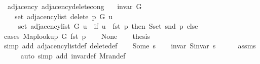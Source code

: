 \begin{isabellebody}
%
\endisadelimproof
\isanewline
{}\isamarkupfalse%
\ {\isacharparenleft}{\kern0pt}\ adjacency{\isacharparenright}{\kern0pt}\ adjacency{\isacharunderscore}{\kern0pt}delete{\isacharunderscore}{\kern0pt}{}{\isacharunderscore}{\kern0pt}cong{\isacharcolon}{\kern0pt}\isanewline
\ \ \ {\isachardoublequoteopen}invar\ G{\isachardoublequoteclose}\isanewline
\ \ \isanewline
\ \ \ \ {\isachardoublequoteopen}set\ {\isacharparenleft}{\kern0pt}adjacency{\isacharunderscore}{\kern0pt}list\ {\isacharparenleft}{\kern0pt}delete{\isacharunderscore}{\kern0pt}{}\ p\ G{\isacharparenright}{\kern0pt}\ u{\isacharparenright}{\kern0pt}\ {\isacharequal}{\kern0pt}\isanewline
\ \ \ \ \ set\ {\isacharparenleft}{\kern0pt}adjacency{\isacharunderscore}{\kern0pt}list\ G\ u{\isacharparenright}{\kern0pt}\ {\isacharminus}{\kern0pt}\ {\isacharparenleft}{\kern0pt}if\ u\ {\isacharequal}{\kern0pt}\ fst\ p\ then\ S{\isachardot}{\kern0pt}set\ {\isacharparenleft}{\kern0pt}snd\ p{\isacharparenright}{\kern0pt}\ else\ {\isacharbraceleft}{\kern0pt}{\isacharbraceright}{\kern0pt}{\isacharparenright}{\kern0pt}{\isachardoublequoteclose}\isanewline
%
\isadelimproof
%
\endisadelimproof
%
\isatagproof
{}\isamarkupfalse%
\ {\isacharparenleft}{\kern0pt}cases\ {\isachardoublequoteopen}Map{\isacharunderscore}{\kern0pt}lookup\ G\ {\isacharparenleft}{\kern0pt}fst\ p{\isacharparenright}{\kern0pt}{\isachardoublequoteclose}{\isacharparenright}{\kern0pt}\isanewline
\ \ \isamarkupfalse%
\ None\isanewline
\ \ \isamarkupfalse%
\ {\isacharquery}{\kern0pt}thesis\isanewline
\ \ \ \ \isamarkupfalse%
\ {\isacharparenleft}{\kern0pt}simp\ add{\isacharcolon}{\kern0pt}\ adjacency{\isacharunderscore}{\kern0pt}list{\isacharunderscore}{\kern0pt}def\ delete{\isacharunderscore}{\kern0pt}{}{\isacharunderscore}{\kern0pt}def{\isacharparenright}{\kern0pt}\isanewline
{}\isamarkupfalse%
\isanewline
\ \ \isamarkupfalse%
\ {\isacharparenleft}{\kern0pt}Some\ s{\isacharprime}{\kern0pt}{\isacharparenright}{\kern0pt}\isanewline
\ \ \isamarkupfalse%
\ invar{\isacharcolon}{\kern0pt}\ {\isachardoublequoteopen}S{\isachardot}{\kern0pt}invar\ s{\isacharprime}{\kern0pt}{\isachardoublequoteclose}\isanewline
\ \ \ \ \isamarkupfalse%
\ assms\isanewline
\ \ \ \ \isamarkupfalse%
\ {\isacharparenleft}{\kern0pt}auto\ simp\ add{\isacharcolon}{\kern0pt}\ invar{\isacharunderscore}{\kern0pt}def\ M{\isachardot}{\kern0pt}ran{\isacharunderscore}{\kern0pt}def{\isacharparenright}{\kern0pt}\isanewline

\end{isabellebody}

